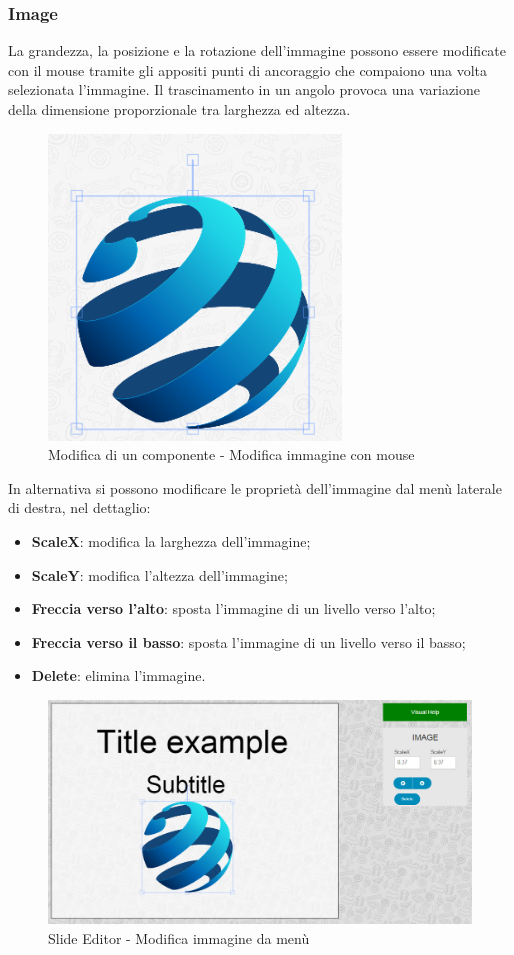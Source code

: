 		
\newpage 

\subsubsection{Image}
La grandezza, la posizione e la rotazione dell'immagine possono essere modificate con il mouse tramite gli appositi punti di ancoraggio che compaiono una volta selezionata l'immagine. Il trascinamento in un angolo provoca una variazione della dimensione proporzionale tra larghezza ed altezza.

\begin{figure}[H] 
	\centering 
	\includegraphics[scale=0.80] {img/img_anchor.png}
	\caption{Modifica di un componente - Modifica immagine con mouse} 
\end{figure}

\noindent In alternativa si possono modificare le proprietà dell'immagine dal menù laterale di destra, nel dettaglio:

		\begin{itemize}
			\item \textbf{ScaleX}: modifica la larghezza dell'immagine;
			\item \textbf{ScaleY}: modifica l'altezza dell'immagine;
			\item \textbf{Freccia verso l'alto}: sposta l'immagine di un livello verso l'alto;
			\item \textbf{Freccia verso il basso}: sposta l'immagine di un livello verso il basso;
			\item \textbf{Delete}: elimina l'immagine.
		\end{itemize}
		
\begin{figure}[H] 
	\centering 
	\includegraphics[scale=0.40] {img/img_edit.png}
	\caption{Slide Editor - Modifica immagine da menù} 
\end{figure}	


